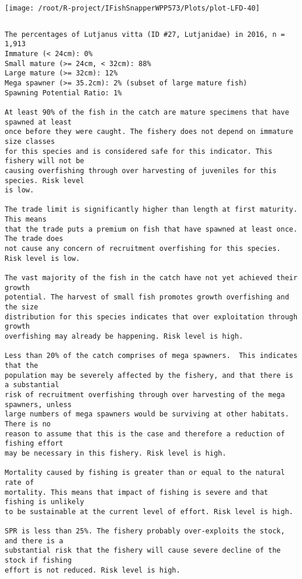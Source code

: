 \documentclass{report}\usepackage[]{graphicx}\usepackage[]{color}
\makeatletter
\def\maxwidth{ %
  \ifdim\Gin@nat@width>\linewidth
    \linewidth
  \else
    \Gin@nat@width
  \fi
}
\newenvironment{kframe}{%
 \def\at@end@of@kframe{}%
 \ifinner\ifhmode%
  \def\at@end@of@kframe{\end{minipage}}%
  \begin{minipage}{\columnwidth}%
 \fi\fi%
 \def\FrameCommand##1{\hskip\@totalleftmargin \hskip-\fboxsep
 \colorbox{shadecolor}{##1}\hskip-\fboxsep
     \hskip-\linewidth \hskip-\@totalleftmargin \hskip\columnwidth}%
 \MakeFramed {\advance\hsize-\width
   \@totalleftmargin\z@ \linewidth\hsize
   \@setminipage}}%
 {\par\unskip\endMakeFramed%
 \at@end@of@kframe}
\newenvironment{knitrout}{}{} %
\makeatother
\begin{document}
\begin{knitrout}
\texttt{[image: /root/R-project/IFishSnapperWPP573/Plots/plot-LFD-40]} 
\begin{kframe}\begin{verbatim}
\end{verbatim}
\end{kframe}
\clearpage
\newpage
\begin{kframe}\begin{verbatim}The percentages of Lutjanus vitta (ID #27, Lutjanidae) in 2016, n = 1,913
Immature (< 24cm): 0%
Small mature (>= 24cm, < 32cm): 88%
Large mature (>= 32cm): 12%
Mega spawner (>= 35.2cm): 2% (subset of large mature fish)
Spawning Potential Ratio: 1%
 
At least 90% of the fish in the catch are mature specimens that have spawned at least
once before they were caught. The fishery does not depend on immature size classes
for this species and is considered safe for this indicator. This fishery will not be
causing overfishing through over harvesting of juveniles for this species. Risk level
is low.

The trade limit is significantly higher than length at first maturity.  This means
that the trade puts a premium on fish that have spawned at least once. The trade does
not cause any concern of recruitment overfishing for this species. Risk level is low.

The vast majority of the fish in the catch have not yet achieved their growth
potential. The harvest of small fish promotes growth overfishing and the size
distribution for this species indicates that over exploitation through growth
overfishing may already be happening. Risk level is high.

Less than 20% of the catch comprises of mega spawners.  This indicates that the
population may be severely affected by the fishery, and that there is a substantial
risk of recruitment overfishing through over harvesting of the mega spawners, unless
large numbers of mega spawners would be surviving at other habitats. There is no
reason to assume that this is the case and therefore a reduction of fishing effort
may be necessary in this fishery. Risk level is high.
 
Mortality caused by fishing is greater than or equal to the natural rate of
mortality. This means that impact of fishing is severe and that fishing is unlikely
to be sustainable at the current level of effort. Risk level is high.
 
SPR is less than 25%. The fishery probably over-exploits the stock, and there is a
substantial risk that the fishery will cause severe decline of the stock if fishing
effort is not reduced. Risk level is high.
 

\end{verbatim}
\end{kframe}
\end{knitrout}
\end{document}
